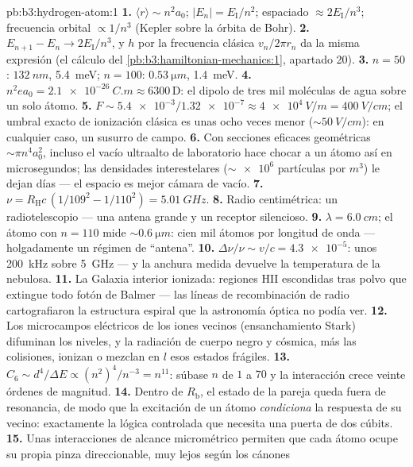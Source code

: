 \begin{solution}{pb:b3:hydrogen-atom:1}
\textbf{1.} $\langle r\rangle \sim n^2a_0$; $|E_n| =
E_{\text{I}}/n^2$; espaciado $\approx 2E_{\text{I}}/n^3$; frecuencia
orbital $\propto 1/n^3$ (Kepler sobre la órbita de Bohr).
\textbf{2.} $E_{n+1} - E_n \to 2E_{\text{I}}/n^3$, y $h$ por
la frecuencia clásica $v_n/2\pi r_n$ da la misma expresión
(el cálculo del \cref{pb:b3:hamiltonian-mechanics:1}, apartado 20).
\textbf{3.} $n = 50$: $\qty{132}{nm}$, \qty{5.4}{meV}; $n = 100$:
$\qty{0.53}{\micro m}$, \qty{1.4}{meV}.
\textbf{4.} $n^2ea_0 = \qty{2.1e-26}{C.m} \approx 6300\,\text{D}$:
el dipolo de tres mil moléculas de agua sobre un solo átomo.
\textbf{5.} $F \sim \num{5.4e-3}/\num{1.32e-7} \approx
\qty{4e4}{V/m} = \qty{400}{V/cm}$; el umbral exacto de ionización clásica
es unas ocho veces menor ($\sim\qty{50}{V/cm}$):
en cualquier caso, un susurro de campo.
\textbf{6.} Con secciones eficaces geométricas $\sim\pi n^4a_0^2$, incluso
el vacío ultraalto de laboratorio hace chocar a un átomo así en
microsegundos; las densidades interestelares ($\sim\num{e6}$ partículas por
$\unit{m^3}$) le dejan días --- el espacio es mejor cámara de vacío.
\textbf{7.} $\nu = R_{\text{H}}c\,(1/109^2 - 1/110^2) =
\qty{5.01}{GHz}$.
\textbf{8.} Radio centimétrica: un radiotelescopio --- una antena grande y
un receptor silencioso.
\textbf{9.} $\lambda = \qty{6.0}{cm}$; el átomo con $n = 110$ mide
$\sim\qty{0.6}{\micro m}$: cien mil átomos por longitud de
onda --- holgadamente un régimen de ``antena''.
\textbf{10.} $\Delta\nu/\nu \sim v/c = \num{4.3e-5}$: unos
\qty{200}{kHz} sobre \qty{5}{GHz} --- y la anchura medida devuelve
la temperatura de la nebulosa.
\textbf{11.} La Galaxia interior ionizada: regiones HII escondidas tras
polvo que extingue todo fotón de Balmer --- las líneas de recombinación de
radio cartografiaron la estructura espiral que la astronomía óptica no podía
ver.
\textbf{12.} Los microcampos eléctricos de los iones vecinos (ensanchamiento
Stark) difuminan los niveles, y la radiación de cuerpo negro y cósmica, más
las colisiones, ionizan o mezclan en $l$ esos estados frágiles.
\textbf{13.} $C_6 \sim d^4/\Delta E \propto (n^2)^4/n^{-3} =
n^{11}$: súbase $n$ de $1$ a $70$ y la interacción crece
veinte órdenes de magnitud.
\textbf{14.} Dentro de $R_{\text{b}}$, el estado de la pareja queda fuera
de resonancia, de modo que la excitación de un átomo \emph{condiciona} la
respuesta de su vecino: exactamente la lógica controlada que necesita una
puerta de dos cúbits.
\textbf{15.} Unas interacciones de alcance micrométrico permiten que cada
átomo ocupe su propia pinza direccionable, muy lejos según los cánones

\end{solution}
